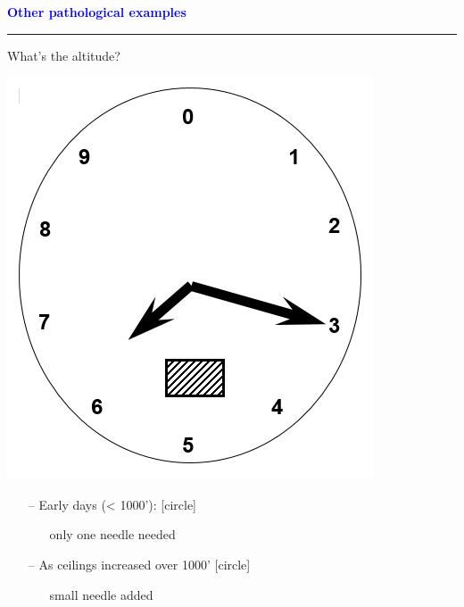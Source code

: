 \documentclass[pdf]{beamer}
\begin{document}
\begin{frame}
    \textcolor{Blue}{\textbf{\Large{Other pathological examples}}}
    \textcolor{red}{\rule{10cm}{1mm}}

\begin{minipage}[t]{0.48\linewidth}
{\large What's the altitude?}

\begin{center}
\includegraphics[scale=0.5]{20_clock.png}
\end{center}

\end{minipage}
\hfill
\begin{minipage}[t]{0.48\linewidth}
\begin{itemize}
	\item[--]  {\normalsize Early days (< 1000'):}
	[circle]
  		\begin{itemize}
      		\item[\textcolor{black}{\textbullet}]  {\small only one needle needed}
  		\end{itemize}

	\item[--]  {\normalsize As ceilings increased over 1000’}
	[circle]
  		\begin{itemize}
      		\item[\textcolor{black}{\textbullet}]  {\small small needle added}
  		\end{itemize}
	

\end{itemize}
\end{minipage}
\end{frame}
\end{document}
